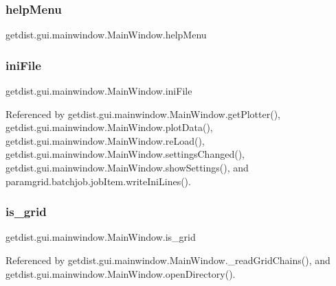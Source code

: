 \subsubsection{\texorpdfstring{help\+Menu}{helpMenu}}
{\footnotesize\ttfamily getdist.\+gui.\+mainwindow.\+Main\+Window.\+help\+Menu}

\mbox{\label{classgetdist_1_1gui_1_1mainwindow_1_1MainWindow_a9819f9af26e32ef151e9ad8ef5aa884f}} 
\subsubsection{\texorpdfstring{ini\+File}{iniFile}}
{\footnotesize\ttfamily getdist.\+gui.\+mainwindow.\+Main\+Window.\+ini\+File}



Referenced by getdist.\+gui.\+mainwindow.\+Main\+Window.\+get\+Plotter(), getdist.\+gui.\+mainwindow.\+Main\+Window.\+plot\+Data(), getdist.\+gui.\+mainwindow.\+Main\+Window.\+re\+Load(), getdist.\+gui.\+mainwindow.\+Main\+Window.\+settings\+Changed(), getdist.\+gui.\+mainwindow.\+Main\+Window.\+show\+Settings(), and paramgrid.\+batchjob.\+job\+Item.\+write\+Ini\+Lines().

\mbox{\label{classgetdist_1_1gui_1_1mainwindow_1_1MainWindow_aa9e61349bb09bbc4434cc97178eaa8d9}} 
\subsubsection{\texorpdfstring{is\+\_\+grid}{is\_grid}}
{\footnotesize\ttfamily getdist.\+gui.\+mainwindow.\+Main\+Window.\+is\+\_\+grid}



Referenced by getdist.\+gui.\+mainwindow.\+Main\+Window.\+\_\+read\+Grid\+Chains(), and getdist.\+gui.\+mainwindow.\+Main\+Window.\+open\+Directory().

